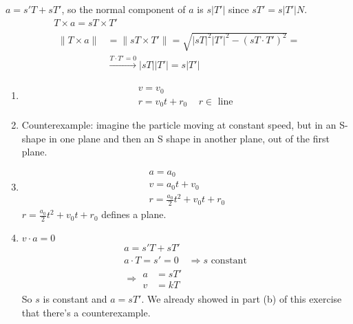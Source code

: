 \documentclass[twoside]{amsart}
\theoremstyle{plain}
\theoremstyle{definition}
\newcommand{\exercisehead}[1]
  {\smallskip
   \noindent{\small\bf Exercise #1.}}
\begin{document}
$a = s' T + sT'$, so the normal component of $a$ is $s|T'|$ since $sT' = s|T'| N$.  
\[
\begin{gathered}
  T\times a = sT \times T' \\
  \begin{aligned}
    \| T \times a \| & = \| sT \times T' \| = \sqrt{ |sT|^2 |T'|^2 - (sT \cdot T')^2 }  = \\
    & \xrightarrow{ T\cdot T' = 0} |sT||T'| = s|T'|
\end{aligned}
\end{gathered}
\]

\exercisehead{9}
\begin{enumerate}
  \item 
\[
\begin{gathered}
  v=v_0 \\
  r= v_0 t + r_0 \quad \, r \in \text{ line }
\end{gathered}
\]
  \item Counterexample: imagine the particle moving at constant speed, but in an S-shape in one plane and then an S shape in another plane, out of the first plane.    
  \item \[
\begin{gathered}
  a = a_0 \\
  v=a_0 t + v_0 \\
  r = \frac{a_0}{2} t^2 + v_0 t + r_0
\end{gathered}
\]
$r = \frac{a_0}{2} t^2 + v_0 t + r_0$ defines a plane.  
\item $v\cdot a =0$
\[
\begin{gathered}
  a = s' T + sT' \\
  a\cdot T = s' = 0 \quad \Longrightarrow s \text{ constant } \\
  \Longrightarrow \begin{aligned}
    a & = sT' \\
    v & = kT
\end{aligned}
\end{gathered}
\]
So $s$ is constant and $a = sT'$.  We already showed in part (b) of this exercise that there's a counterexample.  
\end{enumerate}
\end{document}
